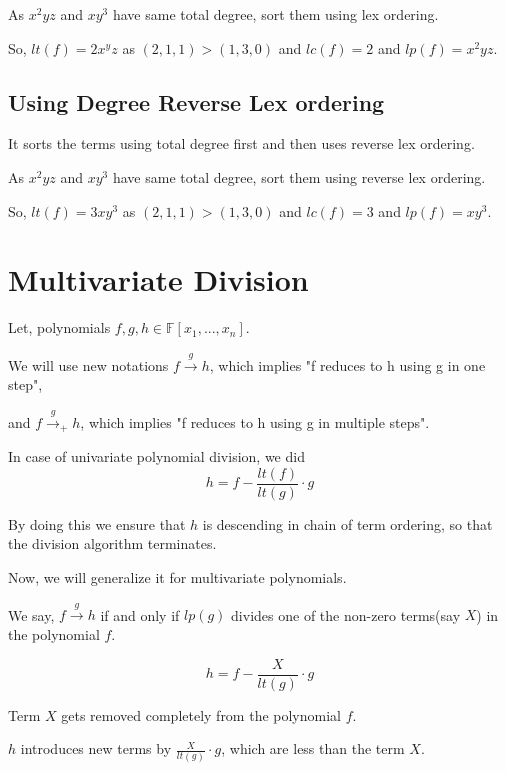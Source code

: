 As $x^2yz$ and $xy^3$ have same total degree, sort them using lex ordering.

So,  $lt(f) = 2x^yz$ as $(2,1,1)>(1,3,0)$ and $lc(f) = 2$ and $lp(f) = x^2yz$.

\subsection{Using Degree Reverse Lex ordering}

It sorts the terms using total degree first and then uses reverse lex ordering.

As $x^2yz$ and $xy^3$ have same total degree, sort them using reverse lex ordering.

So,  $lt(f) = 3xy^3$ as $(2,1,1)>(1,3,0)$ and $lc(f) = 3$ and $lp(f) = xy^3$.

\section{Multivariate Division}
Let, polynomials $f,g,h \in  \mathbb{F}[x_1,...,x_n]$.

We will use new notations $f \mathop \rightarrow \limits^{g} h$, which implies "f reduces to h using g in one step",

and $f {\mathop \rightarrow \limits^{g}}_{+} h$, which implies "f reduces to h using g in multiple steps".

In case of univariate polynomial division, we did
$$ h = f - \frac{lt(f)}{lt(g)}\cdot g$$

By doing this we ensure that $h$ is descending in chain of term ordering, so that the division algorithm terminates.

Now, we will generalize it for  multivariate polynomials.

\begin{definition}
We say, $f \mathop \rightarrow \limits^{g} h$ if and only if $lp(g)$ divides one of the non-zero terms(say $X$) in the polynomial $f$.

$$ h = f - \frac{X}{lt(g)}\cdot g$$
\end{definition}

\begin{observation}
Term $X$ gets removed completely from the polynomial $f$.
\end{observation}
\begin{observation}
$h$ introduces new terms by $\frac{X}{lt(g)}\cdot g$, which are less than the term $X$.
\end{observation}

